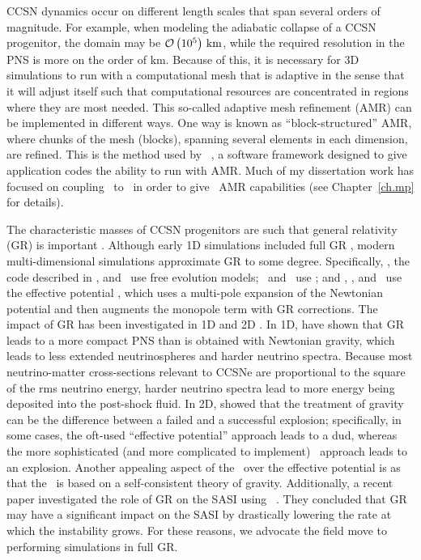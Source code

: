 CCSN dynamics occur on different
length scales that span several orders of magnitude.
For example, when modeling the adiabatic collapse of a CCSN progenitor,
the domain may be $\mathcal{O}\left(10^{5}\right)\,\mathrm{km}$,
while the required resolution in the PNS is more on the order of km.
Because of this, it is necessary for 3D simulations to run with a computational
mesh that is adaptive in the sense that it will adjust itself such that
computational resources are concentrated in regions where they are most needed.
This so-called adaptive mesh refinement (AMR) can be implemented in different
ways.
One way is known as ``block-structured'' AMR,
where chunks of the mesh (blocks), spanning
several elements in each dimension, are refined.
This is the method used by \amrex\ \citep{zab2019}, a software framework designed to give
application codes the ability to run with AMR.
Much of my dissertation work has focused on coupling \thornado\ to \amrex\ in
order to give \thornado\ AMR capabilities (see Chapter~\ref{ch.mp} for details).

The characteristic masses of CCSN progenitors are such that general relativity
(GR) is important \citep[e.g., see][]{lmt2001}.
Although early 1D simulations included full GR
\citep[e.g.,][]{mw1966}, modern multi-dimensional simulations approximate
GR to some degree.
Specifically, \zelmani, the code described in
\citet{ktk2016}, and \nadafld\ use free evolution models;
\cocov\ and \gmunu\ use \xcfc;
and \fornax, \chimera, and \flashx\ use the effective potential \citep{mdj2006},
which uses a multi-pole expansion of the Newtonian potential and then augments
the monopole term with GR corrections.
The impact of GR has been investigated in 1D \citep{bdm2001,lmm2012}
and 2D \citep{mjm2012,oc2018}.
In 1D, \citet{bdm2001} have shown that GR leads to a more compact PNS than is
obtained with Newtonian gravity, which leads to less extended neutrinospheres
and harder neutrino spectra.
Because most neutrino-matter cross-sections relevant to CCSNe are proportional to
the square of the rms neutrino energy, harder neutrino spectra lead to more
energy being deposited into the post-shock fluid.
In 2D, \citet{mjm2012} showed that the treatment of gravity
can be the difference between a failed and a successful explosion;
specifically, in some cases, the oft-used
``effective potential'' approach \citep{mdj2006} leads to a dud, whereas
the more sophisticated (and more complicated to implement) \xcfc\ approach
leads to an explosion.
Another appealing aspect of the \xcfc\ over the effective potential
is as that the \xcfc\ is based on a self-consistent theory of gravity.
Additionally, a recent paper investigated the role of GR on the SASI
using \thornado\ \citep{dem2024}.
They concluded that GR may have a significant impact on the SASI by drastically
lowering the rate at which the instability grows.
For these reasons, we advocate the field move to performing simulations
in full GR.


